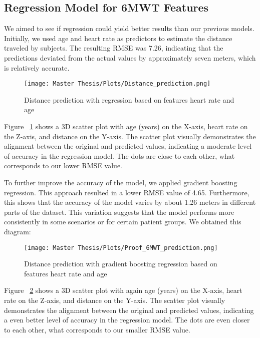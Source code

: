 \subsection{Regression Model for 6MWT Features}

We aimed to see if regression could yield better results than our previous models. Initially, we used age and heart rate as predictors to estimate the distance traveled by subjects. The resulting RMSE was 7.26, indicating that the predictions deviated from the actual values by approximately seven meters, which is relatively accurate.

\FloatBarrier
\begin{figure}[h!]
    \centering
    \texttt{[image: Master Thesis/Plots/Distance\_prediction.png]}
    \caption{Distance prediction with regression based on features heart rate and age}
\label{figure:distregwithHRage}
\end{figure}
\FloatBarrier

Figure ~\ref{figure:distregwithHRage} shows a 3D scatter plot with age (years) on the X-axis, heart rate on the Z-axis, and distance on the Y-axis. The scatter plot visually demonstrates the alignment between the original and predicted values, indicating a moderate level of accuracy in the regression model. The dots are close to each other, what corresponds to our lower RMSE value.

To further improve the accuracy of the model, we applied gradient boosting regression. This approach resulted in a lower RMSE value of 4.65. Furthermore, this shows that the accuracy of the model varies by about 1.26 meters in different parts of the dataset. This variation suggests that the model performs more consistently in some scenarios or for certain patient groups.
We obtained this diagram: 

\FloatBarrier
\begin{figure}[h!]
    \centering
    \texttt{[image: Master Thesis/Plots/Proof\_6MWT\_prediction.png]}
    \caption{Distance prediction with gradient boosting regression based on features heart rate and age}
    \label{figure:distGBregwithHRage}
\end{figure}
\FloatBarrier

Figure ~\ref{figure:distGBregwithHRage} shows a 3D scatter plot with again age (years) on the X-axis, heart rate on the Z-axis, and distance on the Y-axis. The scatter plot visually demonstrates the alignment between the original and predicted values, indicating a even better level of accuracy in the regression model. The dots are even closer to each other, what corresponds to our smaller RMSE value.

